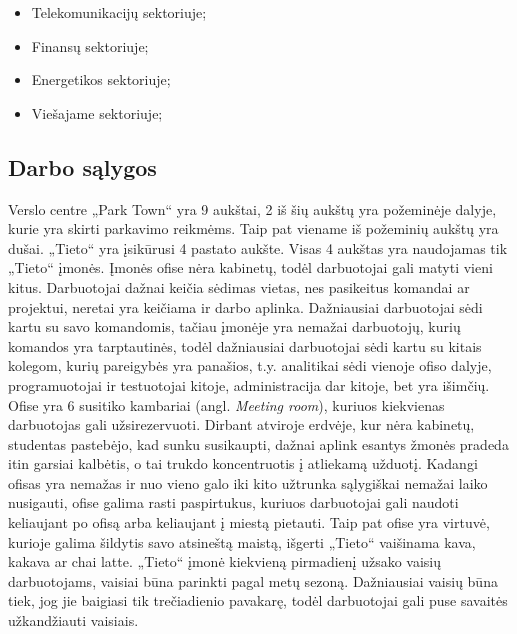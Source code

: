 \documentclass{VUMIFPSbakalaurinis}
\begin{document}
\begin{itemize}
    \item Telekomunikacijų sektoriuje;
    \item Finansų sektoriuje;
    \item Energetikos sektoriuje;
    \item Viešajame sektoriuje;
\end{itemize}

\subsection{Darbo sąlygos}
Verslo centre „Park Town“ yra 9 aukštai, 2 iš šių aukštų yra požeminėje dalyje, kurie yra skirti parkavimo reikmėms. Taip pat viename iš požeminių aukštų yra dušai. „Tieto“ yra įsikūrusi 4 pastato aukšte. Visas 4 aukštas yra naudojamas tik „Tieto“ įmonės. Įmonės ofise nėra kabinetų, todėl darbuotojai gali matyti vieni kitus. Darbuotojai dažnai keičia sėdimas vietas, nes pasikeitus komandai ar projektui, neretai yra keičiama ir darbo aplinka. Dažniausiai darbuotojai sėdi kartu su savo komandomis, tačiau įmonėje yra nemažai darbuotojų, kurių komandos yra tarptautinės, todėl dažniausiai darbuotojai sėdi kartu su kitais kolegom, kurių pareigybės yra panašios, t.y. analitikai sėdi vienoje ofiso dalyje, programuotojai ir testuotojai kitoje, administracija dar kitoje, bet yra išimčių. Ofise yra 6 susitiko kambariai (angl. \textit{Meeting room}), kuriuos kiekvienas darbuotojas gali užsirezervuoti. Dirbant atviroje erdvėje, kur nėra kabinetų, studentas pastebėjo, kad sunku susikaupti, dažnai aplink esantys žmonės pradeda itin garsiai kalbėtis, o tai trukdo koncentruotis į atliekamą užduotį. Kadangi ofisas yra nemažas ir nuo vieno galo iki kito užtrunka sąlygiškai nemažai laiko nusigauti, ofise galima rasti paspirtukus, kuriuos darbuotojai gali naudoti keliaujant po ofisą arba keliaujant į miestą pietauti. Taip pat ofise yra virtuvė, kurioje galima šildytis savo atsineštą maistą, išgerti „Tieto“ vaišinama kava, kakava ar chai latte. „Tieto“ įmonė kiekvieną pirmadienį užsako vaisių darbuotojams, vaisiai būna parinkti pagal metų sezoną. Dažniausiai vaisių būna tiek, jog jie baigiasi tik trečiadienio pavakarę, todėl darbuotojai gali puse savaitės užkandžiauti vaisiais.
\end{document}
